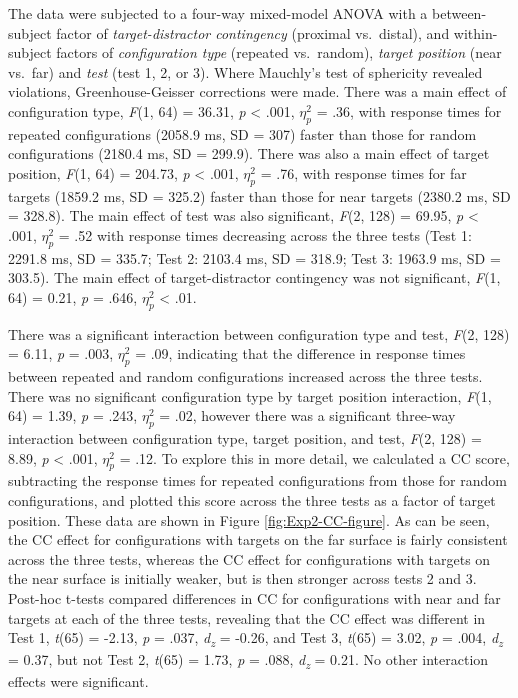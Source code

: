 \documentclass[
  english,
  man,floatsintext]{apa7}
\begin{document}
The data were subjected to a four-way mixed-model ANOVA with a between-subject factor of \emph{target-distractor contingency} (proximal vs.~distal), and within-subject factors of \emph{configuration type} (repeated vs.~random), \emph{target position} (near vs.~far) and \emph{test} (test 1, 2, or 3). Where Mauchly's test of sphericity revealed violations, Greenhouse-Geisser corrections were made. There was a main effect of configuration type, \emph{F}(1, 64) = 36.31, \emph{p} \textless{} .001, \(\eta^2_p\) = .36, with response times for repeated configurations (2058.9 ms, SD = 307) faster than those for random configurations (2180.4 ms, SD = 299.9). There was also a main effect of target position, \emph{F}(1, 64) = 204.73, \emph{p} \textless{} .001, \(\eta^2_p\) = .76, with response times for far targets (1859.2 ms, SD = 325.2) faster than those for near targets (2380.2 ms, SD = 328.8). The main effect of test was also significant, \emph{F}(2, 128) = 69.95, \emph{p} \textless{} .001, \(\eta^2_p\) = .52 with response times decreasing across the three tests (Test 1: 2291.8 ms, SD = 335.7; Test 2: 2103.4 ms, SD = 318.9; Test 3: 1963.9 ms, SD = 303.5). The main effect of target-distractor contingency was not significant, \emph{F}(1, 64) = 0.21, \emph{p} = .646, \(\eta^2_p\) \textless{} .01.

There was a significant interaction between configuration type and test, \emph{F}(2, 128) = 6.11, \emph{p} = .003, \(\eta^2_p\) = .09, indicating that the difference in response times between repeated and random configurations increased across the three tests. There was no significant configuration type by target position interaction, \emph{F}(1, 64) = 1.39, \emph{p} = .243, \(\eta^2_p\) = .02, however there was a significant three-way interaction between configuration type, target position, and test, \emph{F}(2, 128) = 8.89, \emph{p} \textless{} .001, \(\eta^2_p\) = .12. To explore this in more detail, we calculated a CC score, subtracting the response times for repeated configurations from those for random configurations, and plotted this score across the three tests as a factor of target position. These data are shown in Figure \ref{fig:Exp2-CC-figure}. As can be seen, the CC effect for configurations with targets on the far surface is fairly consistent across the three tests, whereas the CC effect for configurations with targets on the near surface is initially weaker, but is then stronger across tests 2 and 3. Post-hoc t-tests compared differences in CC for configurations with near and far targets at each of the three tests, revealing that the CC effect was different in Test 1, \emph{t}(65) = -2.13, \emph{p} = .037, \emph{d\textsubscript{z}} = -0.26, and Test 3, \emph{t}(65) = 3.02, \emph{p} = .004, \emph{d\textsubscript{z}} = 0.37, but not Test 2, \emph{t}(65) = 1.73, \emph{p} = .088, \emph{d\textsubscript{z}} = 0.21. No other interaction effects were significant.
\end{document}
